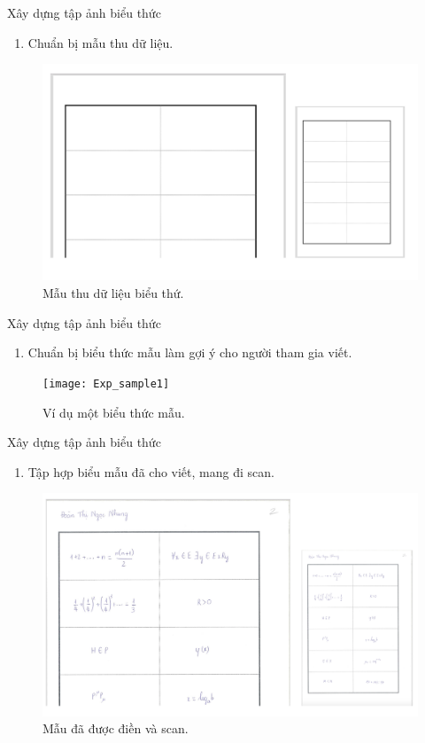 \documentclass{beamer}
\newcounter{saveenumi}
\newcommand{\seti}{\setcounter{saveenumi}{\value{enumi}}}
\newcommand{\conti}{\setcounter{enumi}{\value{saveenumi}}}
\begin{document}
	\begin{frame}[<+->]{Xây dựng tập ảnh biểu thức}
		\begin{enumerate}
			\item Chuẩn bị mẫu thu dữ liệu.
			\seti
		\end{enumerate}
		\begin{figure}[!h]
			\centering
			\includegraphics[width=0.9\linewidth]{getExp}
			\vspace{0.2cm}
			\caption{Mẫu thu dữ liệu biểu thứ.}
		\end{figure}
	\end{frame}
	
	\begin{frame}[<+->]{Xây dựng tập ảnh biểu thức}
		\begin{enumerate}
			\conti
			\item Chuẩn bị biểu thức mẫu làm gợi ý cho người tham gia viết.
			\seti
		\end{enumerate}
		\begin{figure}[!h]
			\centering
			\texttt{[image: Exp\_sample1]}
			\vspace{0.5cm}
			\caption{Ví dụ một biểu thức mẫu.}
		\end{figure}
	\end{frame}
	
	\begin{frame}{Xây dựng tập ảnh biểu thức}
		\begin{enumerate}
			\conti
			\item Tập hợp biểu mẫu đã cho viết, mang đi scan.
			\seti
		\end{enumerate}
		\begin{figure}[!h]
			\centering
			\includegraphics[width=0.85\linewidth]{Exp_sample}
			\vspace{0.2cm}
			\caption{Mẫu đã được điền và scan.}
		\end{figure}
	\end{frame}
	
\end{document}
